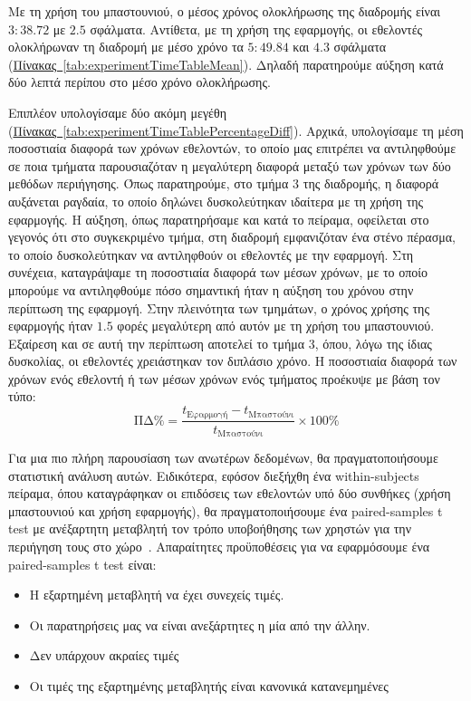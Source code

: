 

Με τη χρήση του μπαστουνιού, ο μέσος χρόνος ολοκλήρωσης της διαδρομής είναι $3:38.72$ με $2.5$ σφάλματα. Αντίθετα, με τη χρήση της εφαρμογής, οι εθελοντές ολοκλήρωναν τη διαδρομή με μέσο χρόνο τα $5:49.84$ και $4.3$ σφάλματα (\hyperref[tab:experimentTimeTableMean]{Πίνακας~\ref*{tab:experimentTimeTableMean}}). Δηλαδή παρατηρούμε αύξηση κατά δύο λεπτά περίπου στο μέσο χρόνο ολοκλήρωσης.

Επιπλέον υπολογίσαμε δύο ακόμη μεγέθη (\hyperref[tab:experimentTimeTablePercentageDiff]{Πίνακας~\ref*{tab:experimentTimeTablePercentageDiff}}). Αρχικά, υπολογίσαμε τη μέση ποσοστιαία διαφορά των χρόνων εθελοντών, το οποίο μας επιτρέπει να αντιληφθούμε σε ποια τμήματα παρουσιαζόταν η μεγαλύτερη διαφορά μεταξύ των χρόνων των δύο μεθόδων περιήγησης. Όπως παρατηρούμε, στο τμήμα 3 της διαδρομής, η διαφορά αυξάνεται ραγδαία, το οποίο δηλώνει δυσκολεύτηκαν ιδαίτερα με τη χρήση της εφαρμογής. Η αύξηση, όπως παρατηρήσαμε και κατά το πείραμα, οφείλεται στο γεγονός ότι στο συγκεκριμένο τμήμα, στη διαδρομή εμφανιζόταν ένα στένο πέρασμα, το οποίο δυσκολεύτηκαν να αντιληφθούν οι εθελοντές με την εφαρμογή. Στη συνέχεια, καταγράψαμε τη ποσοστιαία διαφορά των μέσων χρόνων, με το οποίο μπορούμε να αντιληφθούμε πόσο σημαντική ήταν η αύξηση του χρόνου στην περίπτωση της εφαρμογή. Στην πλεινότητα των τμημάτων, ο χρόνος χρήσης της εφαρμογής ήταν $1.5$ φορές μεγαλύτερη από αυτόν με τη χρήση του μπαστουνιού. Εξαίρεση και σε αυτή την περίπτωση αποτελεί το τμήμα 3, όπου, λόγω της ίδιας δυσκολίας, οι εθελοντές χρειάστηκαν τον διπλάσιο χρόνο. Η ποσοστιαία διαφορά των χρόνων ενός εθελοντή ή των μέσων χρόνων ενός τμήματος προέκυψε με βάση τον τύπο:
\[
    \text{ΠΔ\%} = \frac{t_{\text{Εφαρμογή}} - t_{\text{Μπαστούνι}}}{t_{\text{Μπαστούνι}}} \times 100\%
\]

Για μια πιο πλήρη παρουσίαση των ανωτέρων δεδομένων, θα πραγματοποιήσουμε στατιστική ανάλυση αυτών. Ειδικότερα, εφόσον διεξήχθη ένα within-subjects πείραμα, όπου καταγράφηκαν οι επιδόσεις των εθελοντών υπό δύο συνθήκες (χρήση μπαστουνιού και χρήση εφαρμογής), θα πραγματοποιήσουμε ένα paired-samples t test με ανέξαρτητη μεταβλητή τον τρόπο υποβοήθησης των χρηστών για την περιήγηση τους στο χώρο~\cite{lazar_2017_research}. Απαραίτητες προϋποθέσεις για να εφαρμόσουμε ένα paired-samples t test είναι:
\begin{itemize}
    \item Η εξαρτημένη μεταβλητή να έχει συνεχείς τιμές.
    \item Οι παρατηρήσεις μας να είναι ανεξάρτητες η μία από την άλλην.
    \item Δεν υπάρχουν ακραίες τιμές
    \item Οι τιμές της εξαρτημένης μεταβλητής είναι κανονικά κατανεμημένες
\end{itemize}

